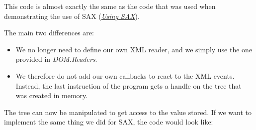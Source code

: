 \documentclass[letterpaper,10pt,english]{sphinxmanual}
\begin{document}
This code is almost exactly the same as the code that was used when
demonstrating the use of SAX ({\hyperref[sax:using-sax]{\emph{Using SAX}}}).

The main two differences are:
\begin{itemize}
\item {} 
We no longer need to define our own XML reader, and we simply use the
one provided in \emph{DOM.Readers}.

\item {} 
We therefore do not add our own callbacks to react to the XML events.
Instead, the last instruction of the program gets a handle on the tree that
was created in memory.

\end{itemize}

The tree can now be manipulated to get access to the value stored.
If we want to implement the same thing we did for SAX, the code would look
like:
\end{document}
